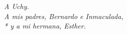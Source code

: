 \cleardoublepage
\thispagestyle{empty}
\null\vskip 1cm
\textit{\raggedleft
  A Uchy.\\
  \vskip 4cm
  A mis padres, Bernardo e Inmaculada,\\*
  y a mi hermana, Esther.\\
}
